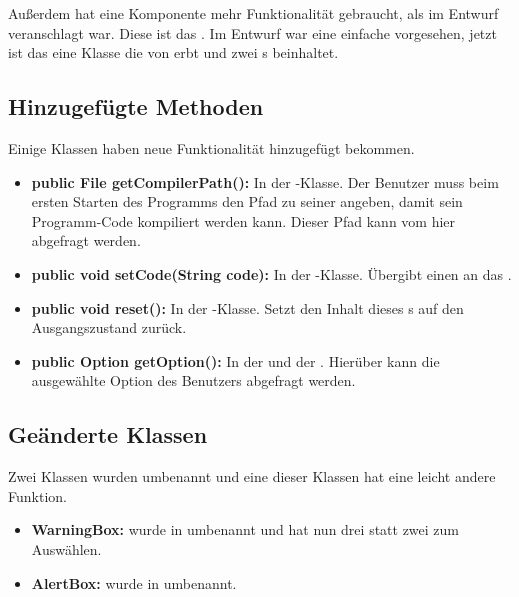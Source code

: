 Außerdem hat eine Komponente mehr Funktionalität gebraucht, als im Entwurf veranschlagt war. Diese ist das .
Im Entwurf war eine einfache  vorgesehen, jetzt ist das  eine Klasse die von  erbt und zwei s beinhaltet.

\newpage
\subsection{Hinzugefügte Methoden}


Einige Klassen haben neue Funktionalität hinzugefügt bekommen.

\begin{itemize}

	\item \textbf{public File getCompilerPath():} In der -Klasse. Der Benutzer muss beim ersten Starten des Programms den Pfad zu seiner  angeben, damit sein Programm-Code kompiliert werden kann. Dieser Pfad kann vom  hier abgefragt werden.

	\item \textbf{public void setCode(String code):} In der -Klasse.
Übergibt einen  an das .

	\item \textbf{public void reset():} In der -Klasse. Setzt den Inhalt dieses s auf den Ausgangszustand zurück.

	\item \textbf{public Option getOption():} In der  und der . Hierüber kann die ausgewählte Option des Benutzers abgefragt werden.

\end{itemize}

\subsection{Geänderte Klassen}


Zwei Klassen wurden umbenannt und eine dieser Klassen hat eine leicht andere Funktion.

\begin{itemize}
	\item \textbf{WarningBox:} wurde in  umbenannt und hat nun drei statt zwei  zum Auswählen.

	\item \textbf{AlertBox:} wurde in  umbenannt.
\end{itemize}

